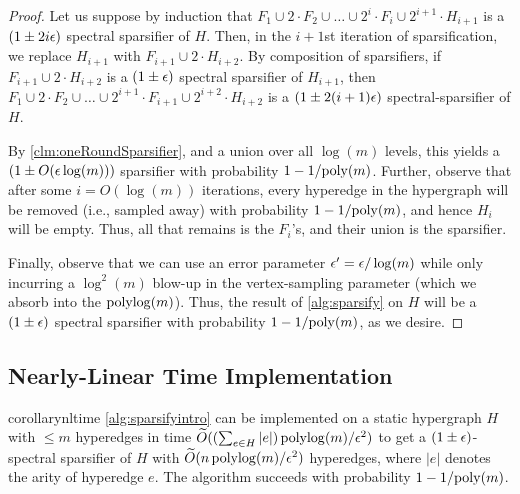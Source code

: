 \documentclass{article}
\begin{document}
\begin{proof}
    Let us suppose by induction that $F_1 \cup 2 \cdot F_2 \cup \dots \cup 2^i \cdot F_i \cup 2^{i+1} \cdot H_{i+1}$ is a $(1 \pm 2i \epsilon)$ spectral sparsifier of $H$. Then, in the $i+1$st iteration of sparsification, we replace $H_{i+1}$ with $F_{i+1} \cup 2 \cdot H_{i+2}$. By composition of sparsifiers, if $F_{i+1} \cup 2 \cdot H_{i+2}$ is a $(1 \pm \epsilon)$ spectral sparsifier of $H_{i+1}$, then $F_1 \cup 2 \cdot F_2 \cup \dots \cup 2^{i+1} \cdot F_{i+1} \cup 2^{i+2} \cdot H_{i+2}$ is a $(1 \pm 2(i+1)\epsilon)$ spectral-sparsifier of $H$.

    By \cref{clm:oneRoundSparsifier}, and a union over all $\log(m)$ levels, this yields a $(1 \pm O(\epsilon \log(m)))$ sparsifier with probability $1 - 1 / \mathrm{poly}(m)$. Further, observe that after some $i = O(\log(m))$ iterations, every hyperedge in the hypergraph will be removed (i.e., sampled away) with probability $1 - 1 / \mathrm{poly}(m)$, and hence $H_i$ will be empty. Thus, all that remains is the $F_i$'s, and their union is the sparsifier.

    Finally, observe that we can use an error parameter $\epsilon' = \epsilon / \log(m)$ while only incurring a $\log^2(m)$ blow-up in the vertex-sampling parameter (which we absorb into the $\operatorname{polylog}(m)$). Thus, the result of \cref{alg:sparsify} on $H$ will be a $(1 \pm \epsilon)$ spectral sparsifier with probability $1 - 1 / \mathrm{poly}(m)$, as we desire.
\end{proof}

\subsection{Nearly-Linear Time Implementation}\label{sec:nltime}

\begin{restatable}{corollary}{nltime}
    \cref{alg:sparsifyintro} can be implemented on a static hypergraph $H$ with $\leq m$ hyperedges in time $\widetilde{O}((\sum_{e\in H} |e|) \operatorname{polylog}(m)/\epsilon^2)$ to get
    a $(1\pm\epsilon)$-spectral sparsifier of $H$ with $\widetilde{O}(n \operatorname{polylog}(m)/\epsilon^2)$ hyperedges,
    where $|e|$ denotes the arity of hyperedge $e$.
    The algorithm succeeds with probability $1-1/\mathrm{poly}(m)$.
\end{restatable}
\end{document}
